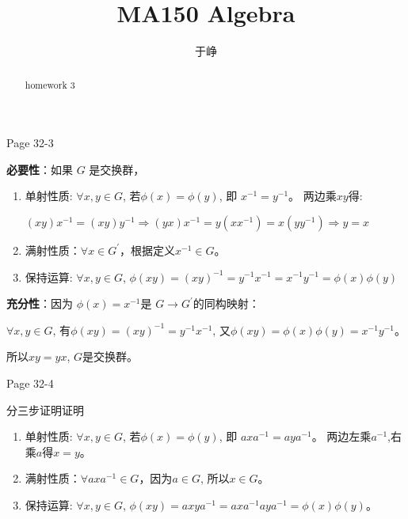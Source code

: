 \documentclass{ximera}
\title{MA150 Algebra }
\author{于峥}
\begin{document}
\begin{abstract}
    homework 3
\end{abstract}
\maketitle

\begin{problem} Page 32-3
    \begin{solution} \textbf{必要性}：如果 $G$ 是交换群，
        \begin{enumerate}
            \item 单射性质: $\forall x, y \in G$, 若$\phi(x) = \phi(y)$, 即 $x^{-1}=y^{-1}$。 两边乘$xy$得:
            
            $(xy)x^{-1}=(xy)y^{-1} \Rightarrow (yx)x^{-1}=y(xx^{-1})=x(yy^{-1})\Rightarrow y=x$
            \item 满射性质：$\forall x \in G^{'}$，根据定义$x^{-1} \in G$。
            \item 保持运算: $\forall x, y \in G$, $\phi(xy)=(xy)^{-1}=y^{-1}x^{-1}=x^{-1}y^{-1}=\phi(x)\phi(y)$
        \end{enumerate}
        
        \textbf{充分性}：因为 $\phi(x)=x^{-1}$是 $G \rightarrow G^{'}$的同构映射：

            $\forall x, y \in G$, 有$\phi(xy)=(xy)^{-1}=y^{-1}x^{-1}$, 又$\phi(xy)=\phi(x)\phi(y)=x^{-1}y^{-1}$。
            
            所以$xy=yx$, $G$是交换群。
    \end{solution}
\end{problem}

\begin{problem} Page 32-4
    \begin{solution} 分三步证明证明
        \begin{enumerate} 
            \item 单射性质: $\forall x, y \in G$, 若$\phi(x) = \phi(y)$, 即 $axa^{-1}=aya^{-1}$。 两边左乘$a^{-1}$,右乘$a$得$x=y$。
            \item 满射性质：$\forall axa^{-1} \in G$，因为$a \in G$, 所以$x \in G$。
            \item 保持运算: $\forall x, y \in G$, $\phi(xy)=axya^{-1}=axa^{-1}aya^{-1}=\phi(x)\phi(y)$。
        \end{enumerate}
    \end{solution}
\end{problem}
\end{document}
